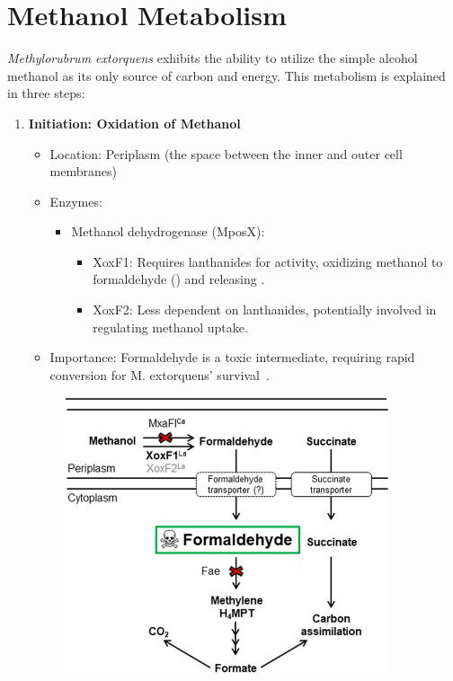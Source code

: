 \section{Methanol Metabolism\authorB}
\emph{Methylorubrum extorquens} exhibits the ability to utilize the simple alcohol methanol  as its only source of carbon and energy.
This metabolism is explained in three steps:

\begin{enumerate}
    \item \textbf{Initiation: Oxidation of Methanol}
    \begin{itemize}
        \item Location: Periplasm (the space between the inner and outer cell membranes)
        \item Enzymes:
        \begin{itemize}
            \item Methanol dehydrogenase (MposX):
            \begin{itemize}
                \item XoxF1: Requires lanthanides for activity, oxidizing methanol to
                formaldehyde () and releasing .
                \item XoxF2: Less dependent on lanthanides, potentially involved in
                regulating methanol uptake.
            \end{itemize}
        \end{itemize}
        \item Importance: Formaldehyde is a toxic intermediate, requiring rapid conversion for M. extorquens' survival~\cite{methanol_metabolism}.
    \end{itemize}
    \begin{figure}[H]
        \centering
        \includegraphics[width=0.9\textwidth]{./media/images/mextorquens_metabolism_methanol}

\end{figure}
\end{enumerate}

